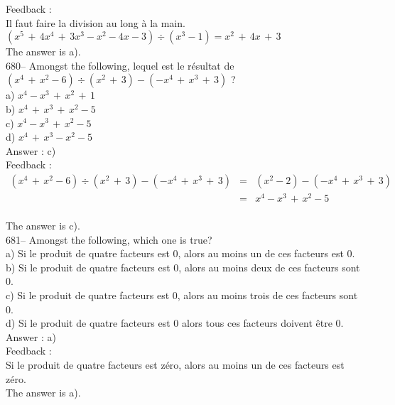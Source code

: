 ﻿\documentclass[letterpaper, 12pt]{article}
\begin{document}
Feedback :\\
Il faut faire la division au long \`a la main.  \\
$\left( x^{5}\,+\,4x^{4}\,+\,3x^{3}-x^{2}-4x-3\right) \div\left(
x^{3}-1\right)=x^{2}\,+\,4x\,+\,3$\\
The answer is a).\\

680-- Amongst the following, lequel est le r\'esultat de $\left(
x^{4}\,+\,x^{2}-6\right) \div\left( x^{2}\,+\,3\right) -\left(
-x^{4}\,+\,x^{3}\,+\,3\right)$ ?\\
a) $x^{4}-x^{3}\,+\,x^{2}\,+\,1$\\
b) $x^{4}\,+\,x^{3}\,+\,x^{2}-5$\\
c) $x^{4}-x^{3}\,+\,x^{2}-5$\\
d) $x^{4}\,+\,x^{3}-x^{2}-5$\\

Answer : c)\\

Feedback :\\
\begin{eqnarray*}
\left( x^{4}\,+\,x^{2}-6\right) \div\left( x^{2}\,+\,3\right) -\left(
-x^{4}\,+\,x^{3}\,+\,3\right)&=&\left( x^{2}-2\right)-\left(
-x^{4}\,+\,x^{3}\,+\,3\right)\\[1mm]
&=&x^{4}-x^{3}\,+\,x^{2}-5\\[1mm]
\end{eqnarray*}

The answer is c).\\

681-- Amongst the following, which one is true?\\
a) Si le produit de quatre facteurs est 0, alors au moins un de ces facteurs
est 0.  \\
b) Si le produit de quatre facteurs est 0, alors au moins deux de ces
facteurs sont 0.  \\
c) Si le produit de quatre facteurs est 0, alors au moins trois de ces
facteurs sont 0.  \\
d) Si le produit de quatre facteurs est 0 alors tous ces facteurs doivent
\^etre 0.\\

Answer : a)\\

Feedback : \\
Si le produit de quatre facteurs est z\'ero, alors au moins un de ces
facteurs est z\'ero.  \\
The answer is a).\\
\end{document}
